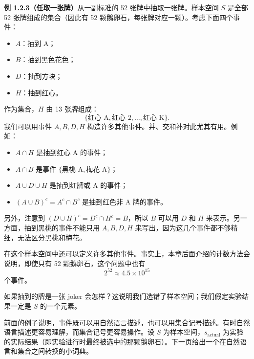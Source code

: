 \documentclass[UTF8,12pt,a4paper,fontset=fandol]{ctexart}
\begin{document}
\noindent\textbf{例 1.2.3（任取一张牌）}\quad 从一副标准的 52 张牌中抽取一张牌。样本空间 $S$ 是全部 52 张牌组成的集合（因此有 52 颗鹅卵石，每张牌对应一颗）。考虑下面四个事件：
\begin{itemize}
  \item $A$：抽到 A；
  \item $B$：抽到黑色花色；
  \item $D$：抽到方块；
  \item $H$：抽到红心。
\end{itemize}
作为集合，$H$ 由 13 张牌组成：
\[
  \{\text{红心 A},\text{红心 2},\ldots,\text{红心 K}\}.
\]
我们可以用事件 $A,B,D,H$ 构造许多其他事件。并、交和补对此尤其有用。例如：
\begin{itemize}
  \item $A\cap H$ 是抽到红心 A 的事件；
  \item $A\cap B$ 是事件 $\{\text{黑桃 A},\text{梅花 A}\}$；
  \item $A\cup D\cup H$ 是抽到红牌或 A 的事件；
  \item $(A\cup B)^c=A^c\cap B^c$ 是抽到红色非 A 牌的事件。
\end{itemize}
另外，注意到 $(D\cup H)^c=D^c\cap H^c=B$，所以 $B$ 可以用 $D$ 和 $H$ 来表示。另一方面，抽到黑桃的事件不能只用 $A,B,D,H$ 来写出，因为这几个事件都不够精细，无法区分黑桃和梅花。

在这个样本空间中还可以定义许多其他事件。事实上，本章后面介绍的计数方法会说明，即使只有 52 颗鹅卵石，这个问题中也有
\[
  2^{52}\approx 4.5\times 10^{15}
\]
个事件。

如果抽到的牌是一张 joker 会怎样？这说明我们选错了样本空间；我们假定实验结果一定是 $S$ 的一个元素。

前面的例子说明，事件既可以用自然语言描述，也可以用集合记号描述。有时自然语言描述更容易理解，而集合记号更容易操作。设 $S$ 为样本空间，$s_{\text{actual}}$ 为实验的实际结果（即实验进行时最终被选中的那颗鹅卵石）。下一页给出一个在自然语言和集合之间转换的小词典。
\end{document}

